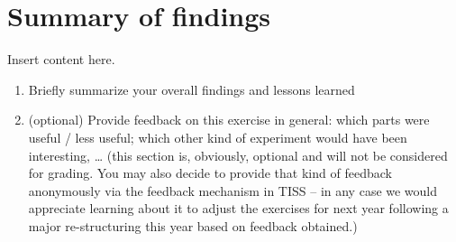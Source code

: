 \documentclass[sigchi]{acmart}
\def\tightlist{}
\begin{document}
\hypertarget{summary-of-findings}{%
\section{Summary of findings}\label{summary-of-findings}}

Insert content here.

\begin{enumerate}
\def\labelenumi{\alph{enumi}.}
\tightlist
\item
  Briefly summarize your overall findings and lessons learned
\item
  (optional) Provide feedback on this exercise in general: which parts were useful / less useful; which other kind of experiment would have been interesting, \ldots{} (this section is, obviously, optional and will not be considered for grading. You may also decide to provide that kind of feedback anonymously via the feedback mechanism in TISS -- in any case we would appreciate learning about it to adjust the exercises for next year following a major re-structuring this year based on feedback obtained.)
\end{enumerate}



\end{document}
